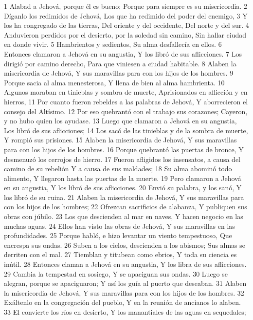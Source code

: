 1 Alabad a Jehová, porque él es bueno;
Porque para siempre es su misericordia.
2 Díganlo los redimidos de Jehová,
Los que ha redimido del poder del enemigo,
3 Y los ha congregado de las tierras,
Del oriente y del occidente,
Del norte y del sur.
4 Anduvieron perdidos por el desierto, por la soledad sin camino,
Sin hallar ciudad en donde vivir.
5 Hambrientos y sedientos,
Su alma desfallecía en ellos.
6 Entonces clamaron a Jehová en su angustia,
Y los libró de sus aflicciones.
7 Los dirigió por camino derecho,
Para que viniesen a ciudad habitable.
8 Alaben la misericordia de Jehová,
Y sus maravillas para con los hijos de los hombres.
9 Porque sacia al alma menesterosa,
Y llena de bien al alma hambrienta.
10 Algunos moraban en tinieblas y sombra de muerte,
Aprisionados en aflicción y en hierros,
11 Por cuanto fueron rebeldes a las palabras de Jehová,
Y aborrecieron el consejo del Altísimo.
12 Por eso quebrantó con el trabajo sus corazones;
Cayeron, y no hubo quien los ayudase.
13 Luego que clamaron a Jehová en su angustia,
Los libró de sus aflicciones;
14 Los sacó de las tinieblas y de la sombra de muerte,
Y rompió sus prisiones.
15 Alaben la misericordia de Jehová,
Y sus maravillas para con los hijos de los hombres.
16 Porque quebrantó las puertas de bronce,
Y desmenuzó los cerrojos de hierro.
17 Fueron afligidos los insensatos, a causa del camino de su rebelión
Y a causa de sus maldades;
18 Su alma abominó todo alimento,
Y llegaron hasta las puertas de la muerte.
19 Pero clamaron a Jehová en su angustia,
Y los libró de sus aflicciones.
20 Envió su palabra, y los sanó,
Y los libró de su ruina.
21 Alaben la misericordia de Jehová,
Y sus maravillas para con los hijos de los hombres;
22 Ofrezcan sacrificios de alabanza,
Y publiquen sus obras con júbilo.
23 Los que descienden al mar en naves,
Y hacen negocio en las muchas aguas,
24 Ellos han visto las obras de Jehová,
Y sus maravillas en las profundidades.
25 Porque habló, e hizo levantar un viento tempestuoso,
Que encrespa sus ondas.
26 Suben a los cielos, descienden a los abismos;
Sus almas se derriten con el mal.
27 Tiemblan y titubean como ebrios,
Y toda su ciencia es inútil.
28 Entonces claman a Jehová en su angustia,
Y los libra de sus aflicciones.
29 Cambia la tempestad en sosiego,
Y se apaciguan sus ondas.
30 Luego se alegran, porque se apaciguaron;
Y así los guía al puerto que deseaban.
31 Alaben la misericordia de Jehová,
Y sus maravillas para con los hijos de los hombres.
32 Exáltenlo en la congregación del pueblo,
Y en la reunión de ancianos lo alaben.
33 El convierte los ríos en desierto,
Y los manantiales de las aguas en sequedales;
